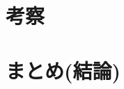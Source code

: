 \documentclass[a4paper,12pt]{jarticle}
\begin{document}
\section{考察}
\section{まとめ(結論)}
\end{document}
